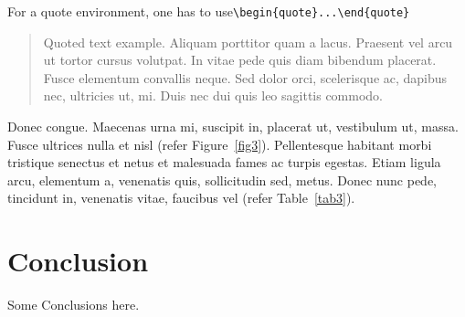 \documentclass[unnumsec,webpdf,modern,large]{mam-authoring-template}%
\theoremstyle{thmstyleone}%
\theoremstyle{thmstyletwo}%
\theoremstyle{thmstylethree}%
\begin{document}
\noindent
For a quote environment, one has to use\newline \verb+\begin{quote}...\end{quote}+
\begin{quote}
Quoted text example. Aliquam porttitor quam a lacus. Praesent vel arcu ut tortor cursus volutpat. In vitae pede quis diam bibendum placerat. Fusce elementum
convallis neque. Sed dolor orci, scelerisque ac, dapibus nec, ultricies ut, mi. Duis nec dui quis leo sagittis commodo.
\end{quote}
Donec congue. Maecenas urna mi, suscipit in, placerat ut, vestibulum ut, massa. Fusce ultrices nulla et nisl (refer Figure~\ref{fig3}). Pellentesque habitant morbi tristique senectus et netus et malesuada fames ac turpis egestas. Etiam ligula arcu,
elementum a, venenatis quis, sollicitudin sed, metus. Donec nunc pede, tincidunt in, venenatis vitae, faucibus vel (refer Table~\ref{tab3}).

\section{Conclusion}

Some Conclusions here.

\end{document}
